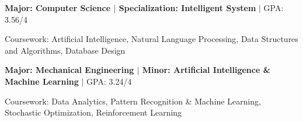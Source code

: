 \vspace{0.4em}
\titlerule
\vspace{0.1em}
\vspace{0.35em}
\begin{spacing}{1.08}
\textnormal{\textbf{Major: Computer Science \texorpdfstring{$\vert$}{|} Specialization: Intelligent System} \texorpdfstring{$\vert$}{|} GPA: 3.56/4}

\textnormal{Coursework: Artificial Intelligence, Natural Language Processing, Data Structures and Algorithms, Database Design}
\end{spacing}
\vspace{-0.1em}
\vspace{0.35em}
\begin{spacing}{1.08}
\textnormal{\textbf{Major: Mechanical Engineering \texorpdfstring{$\vert$}{|} Minor: Artificial Intelligence \& Machine Learning} \texorpdfstring{$\vert$}{|} GPA: 3.24/4}

\textnormal{Coursework: Data Analytics, Pattern Recognition \& Machine Learning, Stochastic Optimization, Reinforcement Learning}
\end{spacing}